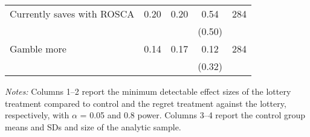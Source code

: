 \begin{table}[h]
{\begin{threeparttable}
\begin{tabular}{l*{4}{c}}
Currently saves with ROSCA&     0.20&     0.20&     0.54&      284\\
          &         &         &   (0.50)&         \\
Gamble more&     0.14&     0.17&     0.12&      284\\
          &         &         &   (0.32)&         \\
\bottomrule \end{tabular} \begin{tablenotes}[flushleft] \footnotesize \item \emph{Notes:} Columns 1--2 report the minimum detectable effect sizes of the lottery treatment compared to control and the regret treatment against the lottery, respectively, with \(\alpha\) = 0.05 and 0.8 power. Columns 3--4 report the control group means and SDs and size of the analytic sample. \end{tablenotes} \end{threeparttable} } \end{table}
